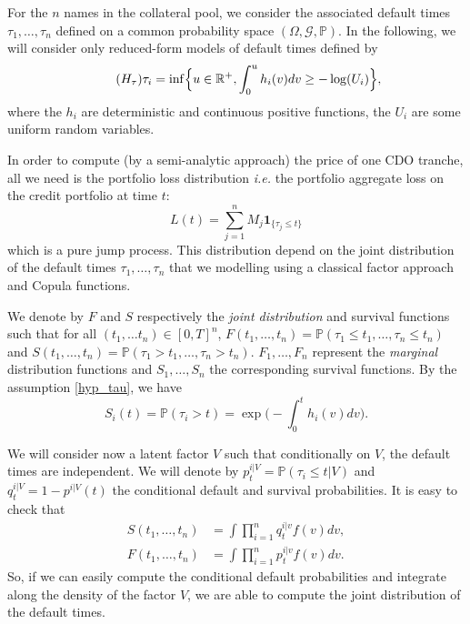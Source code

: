\documentclass[10pt, a4paper]{article}
\renewcommand{\P}{\mathbb{P}}
\begin{document}
For the $n$ names in the collateral pool, we consider the associated default times $\tau_1,\dots, \tau_n$ defined on a common probability space $(\Omega, \mathcal{G}, \P)$. In the following, we will consider only reduced-form models of default times defined by  
\begin{equation} \label{hyp_tau} \tag{$H_\tau$}
    \tau_i = \inf \Bigl\{ u \in \mathbb{R}^+, \int_0^u h_i(v) d v \ge - \log(U_i) \Bigr\},
\end{equation}
where the $h_i$ are deterministic and continuous positive functions, the $U_i$ are some uniform random variables.

In order to compute (by a semi-analytic approach) the price of one CDO tranche, all we need is the portfolio loss distribution \emph{i.e.} the portfolio aggregate loss on the credit portfolio at time $t$: 
\begin{equation*}
    L(t) = \sum_{j=1}^n M_j \mathbf{1}_{\{\tau_j \le t\}}
\end{equation*}
which is a pure jump process. This distribution depend on the joint distribution of the default times $\tau_1, \dots, \tau_n$ that we modelling using a classical factor approach and Copula functions.

We denote by $F$ and $S$ respectively the \emph{joint distribution} and survival functions such that for all $(t_1,\dots t_n) \in [0,T]^n$, $F(t_1,\dots, t_n) = \P(\tau_1 \le t_1, \dots, \tau_n \le t_n)$ and $S(t_1,\dots,t_n) = \P(\tau_1 > t_1, \dots, \tau_n > t_n)$. $F_1,\dots,F_n$ represent the \emph{marginal} distribution functions and $S_1,\dots, S_n$ the corresponding survival functions. By the assumption \eqref{hyp_tau}, we have 
\begin{equation*}
    S_i(t) = \P(\tau_i > t) = \exp\bigl( -\int_0^t h_i(v) d v \bigr).
\end{equation*}

We will consider now a latent factor $V$ such that conditionally on $V$, the default times are independent. We will denote by $p^{i|V}_t = \P(\tau_i \le t | V)$ and $q^{i|V}_t = 1-p^{i|V}(t)$ the conditional default and survival
probabilities. It is easy to check that 
\begin{align*}
    S(t_1,\dots,t_n) &= \int \prod_{i=1}^n q^{i|v}_t f(v) d v,\\
    F(t_1,\dots,t_n) &= \int \prod_{i=1}^n p^{i|v}_t f(v) d v.
\end{align*}
So, if we can easily compute the conditional default probabilities and integrate along the density of the factor $V$, we are able to compute the joint distribution of the default times. 
\end{document}
